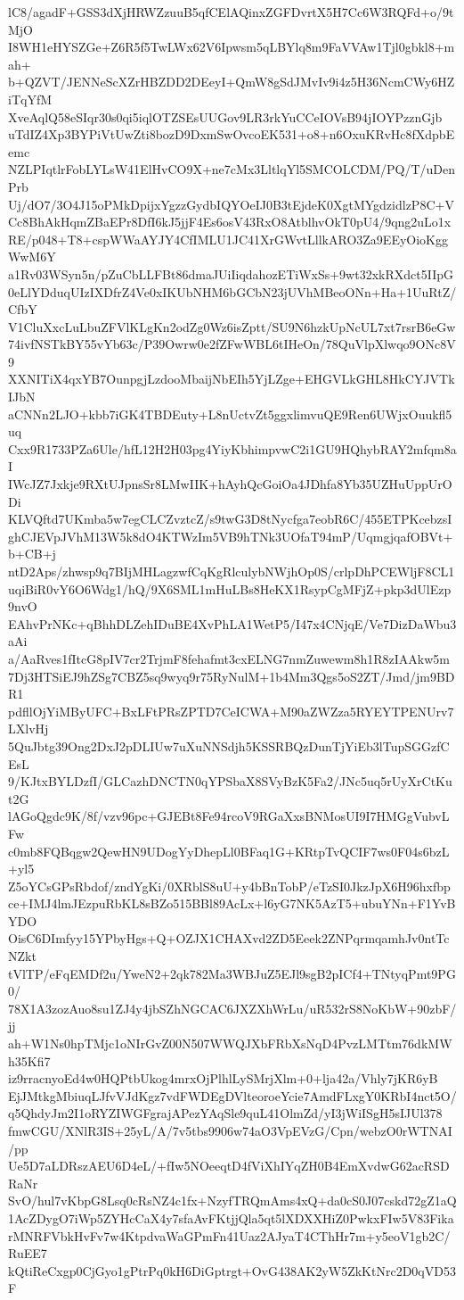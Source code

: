 lC8/agadF+GSS3dXjHRWZzuuB5qfCElAQinxZGFDvrtX5H7Cc6W3RQFd+o/9tMjO
I8WH1eHYSZGe+Z6R5f5TwLWx62V6Ipwsm5qLBYlq8m9FaVVAw1Tjl0gbkl8+mah+
b+QZVT/JENNeScXZrHBZDD2DEeyI+QmW8gSdJMvIv9i4z5H36NcmCWy6HZiTqYfM
XveAqlQ58eSIqr30s0qi5iqlOTZSEsUUGov9LR3rkYuCCeIOVsB94jIOYPzznGjb
uTdIZ4Xp3BYPiVtUwZti8bozD9DxmSwOvcoEK531+o8+n6OxuKRvHc8fXdpbEemc
NZLPIqtlrFobLYLsW41ElHvCO9X+ne7cMx3LltlqYl5SMCOLCDM/PQ/T/uDenPrb
Uj/dO7/3O4J15oPMkDpijxYgzzGydbIQYOeIJ0B3tEjdeK0XgtMYgdzidlzP8C+V
Cc8BhAkHqmZBaEPr8DfI6kJ5jjF4Es6osV43RxO8AtblhvOkT0pU4/9qng2uLo1x
RE/p048+T8+cspWWaAYJY4CfIMLU1JC41XrGWvtLllkARO3Za9EEyOioKggWwM6Y
a1Rv03WSyn5n/pZuCbLLFBt86dmaJUiIiqdahozETiWxSs+9wt32xkRXdct5IIpG
0eLlYDduqUIzIXDfrZ4Ve0xIKUbNHM6bGCbN23jUVhMBeoONn+Ha+1UuRtZ/CfbY
V1CluXxcLuLbuZFVlKLgKn2odZg0Wz6isZptt/SU9N6hzkUpNcUL7xt7rsrB6eGw
74ivfNSTkBY55vYb63c/P39Owrw0e2fZFwWBL6tIHeOn/78QuVlpXlwqo9ONc8V9
XXNITiX4qxYB7OunpgjLzdooMbaijNbEIh5YjLZge+EHGVLkGHL8HkCYJVTkIJbN
aCNNn2LJO+kbb7iGK4TBDEuty+L8nUctvZt5ggxlimvuQE9Ren6UWjxOuukfl5uq
Cxx9R1733PZa6Ule/hfL12H2H03pg4YiyKbhimpvwC2i1GU9HQhybRAY2mfqm8aI
IWcJZ7Jxkje9RXtUJpnsSr8LMwIIK+hAyhQcGoiOa4JDhfa8Yb35UZHuUppUrODi
KLVQftd7UKmba5w7egCLCZvztcZ/s9twG3D8tNycfga7eobR6C/455ETPKcebzsI
ghCJEVpJVhM13W5k8dO4KTWzIm5VB9hTNk3UOfaT94mP/UqmgjqafOBVt+b+CB+j
ntD2Aps/zhwsp9q7BIjMHLagzwfCqKgRlculybNWjhOp0S/crlpDhPCEWljF8CL1
uqiBiR0vY6O6Wdg1/hQ/9X6SML1mHuLBs8HeKX1RsypCgMFjZ+pkp3dUlEzp9nvO
EAhvPrNKc+qBhhDLZehIDuBE4XvPhLA1WetP5/I47x4CNjqE/Ve7DizDaWbu3aAi
a/AaRves1fItcG8pIV7cr2TrjmF8fehafmt3cxELNG7nmZuwewm8h1R8zIAAkw5m
7Dj3HTSiEJ9hZSg7CBZ5sq9wyq9r75RyNulM+1b4Mm3Qgs5oS2ZT/Jmd/jm9BDR1
pdfllOjYiMByUFC+BxLFtPRsZPTD7CeICWA+M90aZWZza5RYEYTPENUrv7LXlvHj
5QuJbtg39Ong2DxJ2pDLIUw7uXuNNSdjh5KSSRBQzDunTjYiEb3lTupSGGzfCEsL
9/KJtxBYLDzfI/GLCazhDNCTN0qYPSbaX8SVyBzK5Fa2/JNc5uq5rUyXrCtKut2G
lAGoQgdc9K/8f/vzv96pc+GJEBt8Fe94rcoV9RGaXxsBNMosUI9I7HMGgVubvLFw
c0mb8FQBqgw2QewHN9UDogYyDhepLl0BFaq1G+KRtpTvQCIF7ws0F04s6bzL+yl5
Z5oYCsGPsRbdof/zndYgKi/0XRblS8uU+y4bBnTobP/eTzSI0JkzJpX6H96hxfbp
ce+IMJ4lmJEzpuRbKL8sBZo515BBl89AcLx+l6yG7NK5AzT5+ubuYNn+F1YvBYDO
OisC6DImfyy15YPbyHgs+Q+OZJX1CHAXvd2ZD5Eeek2ZNPqrmqamhJv0ntTcNZkt
tVlTP/eFqEMDf2u/YweN2+2qk782Ma3WBJuZ5EJl9sgB2pICf4+TNtyqPmt9PG0/
78X1A3zozAuo8su1ZJ4y4jbSZhNGCAC6JXZXhWrLu/uR532rS8NoKbW+90zbF/jj
ah+W1Ns0hpTMjc1oNIrGvZ00N507WWQJXbFRbXsNqD4PvzLMTtm76dkMWh35Kfi7
iz9rracnyoEd4w0HQPtbUkog4mrxOjPlhlLySMrjXlm+0+lja42a/Vhly7jKR6yB
EjJMtkgMbiuqLJfvVJdKgz7vdFWDEgDVlteoroeYcie7AmdFLxgY0KRbI4nct5O/
q5QhdyJm2I1oRYZIWGFgrajAPezYAqSle9quL41OlmZd/yI3jWiISgH5sIJUl378
fmwCGU/XNlR3IS+25yL/A/7v5tbs9906w74aO3VpEVzG/Cpn/webzO0rWTNAI/pp
Ue5D7aLDRszAEU6D4eL/+fIw5NOeeqtD4fViXhIYqZH0B4EmXvdwG62acRSDRaNr
SvO/hul7vKbpG8Lsq0cRsNZ4c1fx+NzyfTRQmAms4xQ+da0cS0J07cskd72gZ1aQ
1AcZDygO7iWp5ZYHcCaX4y7sfaAvFKtjjQla5qt5lXDXXHiZ0PwkxFIw5V83Fika
rMNRFVbkHvFv7w4KtpdvaWaGPmFn41Uaz2AJyaT4CThHr7m+y5eoV1gb2C/RuEE7
kQtiReCxgp0CjGyo1gPtrPq0kH6DiGptrgt+OvG438AK2yW5ZkKtNrc2D0qVD53F
